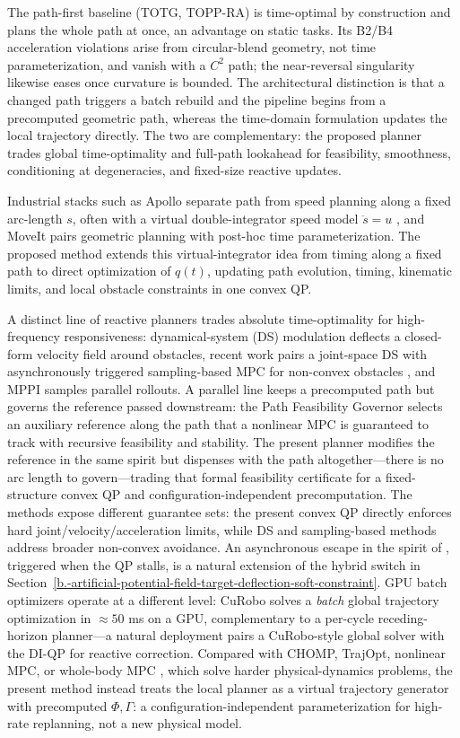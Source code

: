 The path-first baseline (TOTG, TOPP-RA) is time-optimal by construction
and plans the whole path at once, an advantage on static tasks. Its B2/B4
acceleration violations arise from circular-blend geometry, not time
parameterization, and vanish with a \(C^2\) path; the near-reversal
singularity likewise eases once curvature is bounded. The architectural
distinction is that a changed path triggers a batch rebuild and the pipeline
begins from a precomputed geometric path, whereas the time-domain formulation
updates the local trajectory directly. The two are complementary: the
proposed planner trades global time-optimality and full-path lookahead for
feasibility, smoothness, conditioning at degeneracies, and fixed-size reactive
updates.

Industrial stacks such as Apollo separate path from speed planning along a
fixed arc-length \(s\), often with a virtual double-integrator speed model
\(\ddot s=u\) \cite{apollo}, and MoveIt pairs geometric planning with
post-hoc time parameterization. The proposed method extends this
virtual-integrator idea from timing along a fixed path to direct
optimization of \(q(t)\), updating path evolution, timing, kinematic
limits, and local obstacle constraints in one convex QP.

A distinct line of reactive planners trades absolute time-optimality for
high-frequency responsiveness: dynamical-system (DS) modulation
\cite{khansari2012} deflects a closed-form velocity field around
obstacles, recent work pairs a joint-space DS with asynchronously
triggered sampling-based MPC for non-convex obstacles \cite{koptev2024},
and MPPI \cite{williams2017} samples parallel rollouts. A parallel line
keeps a precomputed path but governs the reference passed downstream: the
Path Feasibility Governor \cite{pathfg} selects an auxiliary reference
along the path that a nonlinear MPC is guaranteed to track with recursive
feasibility and stability. The present planner modifies the reference in
the same spirit but dispenses with the path altogether---there is no arc
length to govern---trading that formal feasibility certificate for a
fixed-structure convex QP and configuration-independent precomputation.
The methods expose different guarantee sets: the present convex QP directly
enforces hard joint/velocity/acceleration limits, while DS and sampling-based
methods address broader non-convex avoidance. An asynchronous escape in the spirit of
\cite{koptev2024}, triggered when the QP stalls, is a natural extension of
the hybrid switch in
Section~\ref{b.-artificial-potential-field-target-deflection-soft-constraint}.
GPU batch optimizers operate at a different level: CuRobo
\cite{curobo2023} solves a \emph{batch} global trajectory optimization in
$\approx\!50$ ms on a GPU, complementary to a per-cycle receding-horizon
planner---a natural deployment pairs a CuRobo-style global solver with the
DI-QP for reactive correction. Compared with CHOMP, TrajOpt, nonlinear
MPC, or whole-body MPC \cite{sleiman2021}, which solve harder
physical-dynamics problems, the present method instead treats the local
planner as a virtual trajectory generator with precomputed \(\Phi,\Gamma\):
a configuration-independent parameterization for high-rate replanning, not
a new physical model.

